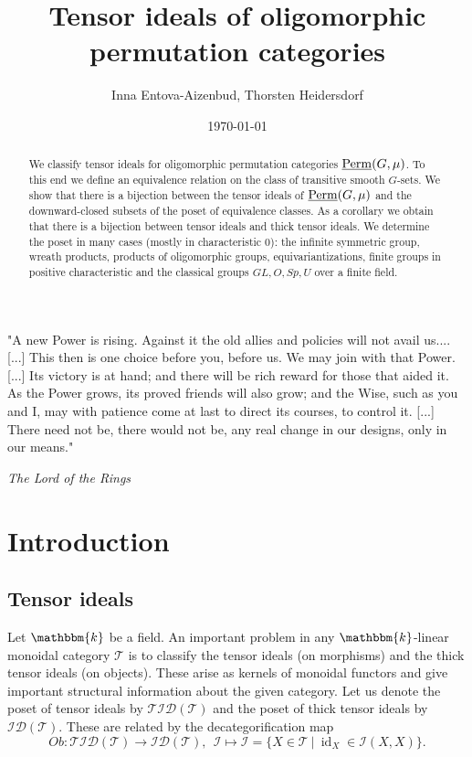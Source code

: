 \documentclass[11pt,a4paper]{amsart}
\theoremstyle{plain}%
\theoremstyle{definition}
\theoremstyle{remark}
\newcommand{\id}{\operatorname{id}}
\newcommand{\Perm}{\underline{{\rm Perm}}}
\newcommand{\kk}{\mathbbm{k}}
\newcommand{\TID}{\mathcal{TID}}
\newcommand{\ID}{\mathcal{ID}}
\newcommand{\I}{\mathcal{I}}
\begin{document}
\title{Tensor ideals of oligomorphic permutation categories}
\date{\today}

  \author{Inna Entova-Aizenbud, Thorsten Heidersdorf}

 \address{I. E.: Department of Mathematics, Ben Gurion University of the Negev, Beer-Sheva, Israel}
 \address{T. H.: School of Mathematics, Statistics and Physics, Newcastle University, UK}



\begin{abstract} We classify tensor ideals for oligomorphic permutation categories $\Perm(G,\mu)$. To this end we define an equivalence relation on the class of transitive smooth $G$-sets. We show that there is a bijection between the tensor ideals of $\Perm(G,\mu)$ and the downward-closed subsets of the poset of equivalence classes. As a corollary we obtain that there is a bijection between tensor ideals and thick tensor ideals. We determine the poset in many cases (mostly in characteristic $0$): the infinite symmetric group, wreath products, products of oligomorphic groups, equivariantizations, finite groups in positive characteristic and the classical groups $ GL, O, Sp, U$ over a finite field.
\end{abstract}

\maketitle

\epigraph{"A new Power is rising. Against it the old allies and policies will not avail us.... [...] This then is one choice before you, before us. We may join with that Power. [...] Its victory is at hand; and there will be rich reward for those that aided it. As the Power grows, its proved friends will also grow; and the Wise, such as you and I, may with patience come at last to direct its courses, to control it. [...] There need not be, there would not be, any real change in our designs, only in our means."}{\textit{The Lord of the Rings \cite{Tolkien}}}

\setcounter{tocdepth}{1}
\tableofcontents

\section{Introduction}

\subsection{Tensor ideals}
Let $\kk$ be a field. An important problem in any $\kk$-linear monoidal category $\mathcal{T}$ is to classify the tensor ideals (on morphisms) and the thick tensor ideals (on objects). These arise as kernels of monoidal functors and give important structural information about the given category. Let us denote the poset of tensor ideals by $\TID(\mathcal{T})$ and the poset of thick tensor ideals by $\ID(\mathcal{T})$. These are related by the decategorification map \[ Ob: \TID(\mathcal{T}) \to \ID(\mathcal{T}), \ \ \I \mapsto \I = \{ X \in \mathcal{T} \ | \ \id_X \in \I(X,X) \}.\]
\end{document}
